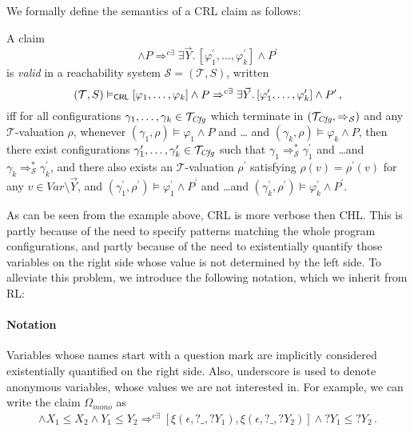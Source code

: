 We formally define the semantics of a CRL claim as follows:
\begin{definition}\label{def:opCRLsemantics}
    A claim
    \begin{equation*}
     [\varphi_1,\ldots,\varphi_k] \land P
     \Rightarrow^{c\exists} \exists \vec{Y}.\, [\varphi^\prime_1,\ldots,\varphi^\prime_k] \land P^\prime
    \end{equation*}
    is \emph{valid} in a reachability system $\mathcal{S} = (\mathcal{T}, S)$,
    written
    \begin{equation*}
        (\mathcal{T}, S) \vDash_{\mathsf{CRL}} [\varphi_1,\ldots,\varphi_k] \land P
     \Rightarrow^{c\exists} \exists \vec{Y}.\, [\varphi^\prime_1,\ldots,\varphi^\prime_k] \land P^\prime \, ,
    \end{equation*}
    iff for all configurations $\gamma_1,\ldots,\gamma_k \in \mathcal{T}_{\mathit{Cfg}}$
    which terminate in $(\mathcal{T}_{\mathit{Cfg}}, \Rightarrow_{\mathcal{S}})$
    and any $\mathcal{T}$-valuation $\rho$,
    whenever $(\gamma_1,\rho) \vDash \varphi_1 \land P$ and \ldots
    and $(\gamma_k,\rho) \vDash \varphi_k \land P$,
    then there exist configurations $\gamma_1^\prime,\ldots,\gamma_k^\prime \in \mathcal{T}_{\mathit{Cfg}}$
    such that $\gamma_1 \Rightarrow^{*}_{\mathcal{S}} \gamma_1^\prime$
    and \ldots and $\gamma_k \Rightarrow^{*}_{\mathcal{S}} \gamma_k^\prime$,
    and there also exists an $\mathcal{T}$-valuation $\rho^\prime$
    satisfying $\rho(v) = \rho^\prime(v)$ for any $v \in \mathit{Var} \setminus \vec{Y}$,
    and
    $(\gamma_1^\prime,\rho^\prime) \vDash \varphi^\prime_1 \land P^\prime$ and \ldots and $(\gamma_k^\prime, \rho^\prime) \vDash \varphi^\prime_k \land P^\prime$.
\end{definition}


As can be seen from the example above, CRL is more verbose then CHL. This is
partly because of the need to specify patterns matching the whole program
configurations, and partly because of the need to existentially quantify those
variables on the right side whose value is not determined by the left side. To
alleviate this problem, we introduce the following notation, which we inherit
from RL:

\paragraph{Notation}
Variables whose names start with a question mark are implicitly considered
existentially quantified on the right side.  Also, underscore is used to
denote anonymous variables, whose values we are not interested in.  For
example, we can write the claim $\Omega_{\textit{mono}}$ as
\begin{align*}
[\xi(P, X_1, Y_1),\xi(P, X_2, Y_2)] \land X_1 \leq X_2 \land Y_1 \leq Y_2
 \Rightarrow^{c\exists} [\xi(\epsilon, ?\_, ?Y_1), \xi(\epsilon, ?\_, ?Y_2)] \land ?Y_1 \leq ?Y_2 \, .
\end{align*}

